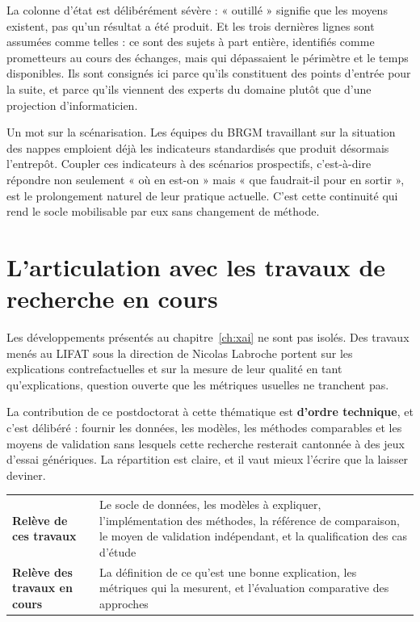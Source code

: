 La colonne d'état est délibérément sévère : « outillé » signifie
que les moyens existent, pas qu'un résultat a été produit. Et les trois dernières lignes sont
assumées comme telles : ce sont des sujets à part entière, identifiés comme prometteurs au cours
des échanges, mais qui dépassaient le périmètre et le temps disponibles. Ils sont consignés ici
parce qu'ils constituent des points d'entrée pour la suite, et parce qu'ils viennent des experts
du domaine plutôt que d'une projection d'informaticien.

Un mot sur la scénarisation. Les équipes du BRGM travaillant
sur la situation des nappes emploient déjà les indicateurs standardisés que produit désormais
l'entrepôt. Coupler ces indicateurs à des scénarios prospectifs, c'est-à-dire répondre non
seulement « où en est-on » mais « que faudrait-il pour en sortir », est le prolongement naturel
de leur pratique actuelle. C'est cette continuité qui rend le socle mobilisable par eux sans
changement de méthode.

\section{L'articulation avec les travaux de recherche en cours}

Les développements présentés au chapitre~\ref{ch:xai} ne sont pas isolés. Des travaux menés au
LIFAT sous la direction de Nicolas Labroche portent sur les explications contrefactuelles et sur
la mesure de leur qualité en tant qu'explications, question ouverte que les métriques usuelles ne
tranchent pas.

La contribution de ce postdoctorat à cette thématique est \textbf{d'ordre technique}, et c'est
délibéré : fournir les données, les modèles, les méthodes comparables et les moyens de
validation sans lesquels cette recherche resterait cantonnée à des jeux d'essai génériques. La
répartition est claire, et il vaut mieux l'écrire que la laisser deviner.

\begin{center}
\begin{tabularx}{\textwidth}{@{}lX@{}}
\toprule
\textbf{Relève de ces travaux} & Le socle de données, les modèles à expliquer, l'implémentation
des méthodes, la référence de comparaison, le moyen de validation indépendant, et la
qualification des cas d'étude \\
\textbf{Relève des travaux en cours} & La définition de ce qu'est une bonne explication, les
métriques qui la mesurent, et l'évaluation comparative des approches \\
\bottomrule
\end{tabularx}
\end{center}

